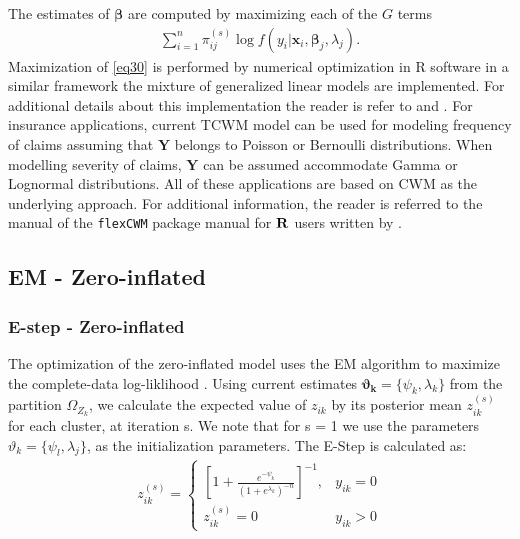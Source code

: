 \documentclass[11pt,letterpaper]{article}
\numberwithin{equation}{section}
\numberwithin{equation}{section}
\numberwithin{equation}{section}
\begin{document}
The estimates of $\bm\beta$ are computed by maximizing each of the $G$ terms
\begin{align}
\sum_{i=1}^{n}\pi^{(s)}_{ij} \log{f}(y_i|\bm x_i,\bm \beta_j,\lambda_j).
\label{eq30}
\end{align}
Maximization of \eqref{eq30} is performed by numerical optimization in R software in a similar framework the mixture of generalized linear models are implemented. For additional details about this implementation the reader is refer to \cite{Wedel+DeSabro:1995} and \cite{Wedel:2002}.
For insurance applications, current TCWM model can be used for modeling frequency of claims assuming that $\bm{Y}$ belongs to Poisson or Bernoulli distributions. When modelling severity of claims, $\bm{Y}$ can be assumed accommodate Gamma or Lognormal distributions. All of these applications are based on CWM as the underlying approach. For additional information, the reader is referred to the manual of the {\tt flexCWM} package manual for ${\bf R}$ users written by \cite{Ingrassia+Punzo+Vittadini+Minotti:2015}.%
\subsection{EM - Zero-inflated}


\subsubsection{E-step -  Zero-inflated}%
The optimization of the zero-inflated model uses the EM algorithm to maximize the complete-data log-liklihood \citep{Lambert}.
Using current estimates $ \bm{
\vartheta_k  }= \{ \psi_k,\lambda_k \}$ from the partition $ \Omega_{Z_k}$, we calculate the expected value of $z_{ik}$ by its posterior mean $z_{ik}^{(s)}$ for each cluster, at iteration s. We note that for s = 1 we use the parameters $\vartheta_k = \{ \psi_l,\lambda_j  \} $, as the initialization parameters. The E-Step is calculated as:%
\begin{align*}
z_{ik}^{(s)} = \begin{cases}  \left[{1+\frac{ e^{-\psi_k}}{(1+e^{\lambda_k})^{-n}}}\right]^{-1}, &  y_{ik} = 0 \\
z_{ik}^{(s)} = 0 & y_{ik}> 0 
\end{cases}
\end{align*}
\end{document}
